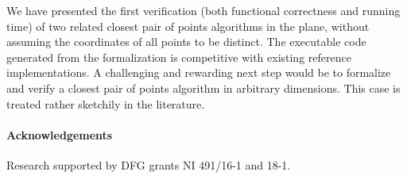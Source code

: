 \begin{isabellebody}
\begin{isamarkuptext}
We have presented the first verification (both functional correctness and running time) of two related
closest pair of points algorithms in the plane, without assuming the  coordinates of all points
to be distinct. The executable code generated from the formalization is competitive with existing
reference implementations. A challenging and rewarding next step would be to formalize and verify a
closest pair of points algorithm in arbitrary dimensions. This case is treated rather sketchily in the literature.

\paragraph{Acknowledgements}
Research supported by DFG grants NI 491/16-1 and 18-1.%
\end{isamarkuptext}\isamarkuptrue%
%
\isadelimtheory
%
\endisadelimtheory
%
\isatagtheory
%
\endisatagtheory
{\isafoldtheory}%
%
\isadelimtheory
%
\endisadelimtheory
%
\end{isabellebody}%
\endinput
